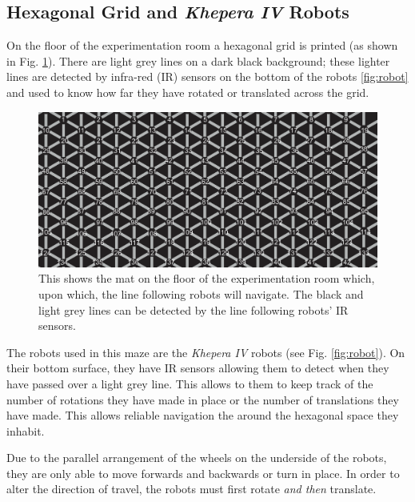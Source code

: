 \subsection{Hexagonal Grid and \textit{Khepera IV} Robots}

On the floor of the experimentation room a hexagonal grid is printed (as shown in Fig. \ref{fig:hexgrid_with_numbers}). There are light grey lines on a dark black background; these lighter lines are detected by infra-red (IR) sensors on the bottom of the robots \ref{fig:robot} and used to know how far they have rotated or translated across the grid.

\begin{figure}[h]
    \centering
    \includegraphics[scale = 0.3]{images/hexgrid_with_numbers.png}
    \caption{This shows the mat on the floor of the experimentation room which, upon which, the line following robots will navigate. The black and light grey lines can be detected by the line following robots' IR sensors.}
    \label{fig:hexgrid_with_numbers}
\end{figure}



The robots used in this maze are the \textit{Khepera IV} robots (see Fig. \ref{fig:robot}). On their bottom surface, they have IR sensors allowing them to detect when they have passed over a light grey line. 
This allows to them to keep track of the number of rotations they have made in place or the number of translations they have made. This allows reliable navigation the around the hexagonal space they inhabit.

Due to the parallel arrangement of the wheels on the underside of the robots, they are only able to move forwards and backwards or turn in place. In order to alter the direction of travel, the robots must first rotate \textit{and then} translate.

